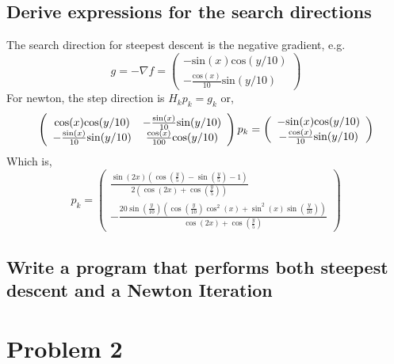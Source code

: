 \documentclass{article}
\begin{document}
\newpage
\subsection{Derive expressions for the search directions}

The search direction for steepest descent is the negative gradient,
e.g. 
\begin{equation*}
g = -\nabla f =\left(
  \begin{array}{ c }
     - \text{sin}(x)\text{cos}(y/10)\\
     - \frac{\text{cos}(x)}{10}\text{sin}(y/10)
  \end{array} \right)
\end{equation*}
For newton, the step direction is $H_k p_k = g_k$ or, 
\begin{equation*}
\left(
  \begin{array}{ c c }
     \text{cos}(x)\text{cos}(y/10) & -\frac{\text{sin}(x)}{10}\text{sin}(y/10) \\
     -\frac{\text{sin}(x)}{10}\text{sin}(y/10) & \frac{\text{cos}(x)}{100}\text{cos}(y/10)
  \end{array} \right)
  p_k  
  = 
\left(
 \begin{array}{ c }
  - \text{sin}(x)\text{cos}(y/10)\\
  - \frac{\text{cos}(x)}{10}\text{sin}(y/10)
   \end{array} \right)
\end{equation*}
Which is, 
\begin{equation*}
 p_k = 
\left(
\begin{array}{c}
 \frac{\sin (2 x) \left(\cos \left(\frac{y}{5}\right)-\sin
   \left(\frac{y}{5}\right)-1\right)}{2 \left(\cos (2 x)+\cos
   \left(\frac{y}{5}\right)\right)} \\
 -\frac{20 \sin \left(\frac{y}{10}\right) \left(\cos
   \left(\frac{y}{10}\right) \cos ^2(x)+\sin ^2(x) \sin
   \left(\frac{y}{10}\right)\right)}{\cos (2 x)+\cos
   \left(\frac{y}{5}\right)}
\end{array}
\right)
\end{equation*}

\subsection{Write a program that performs both steepest descent and a
  Newton Iteration} 


\section{Problem 2}
\end{document}

